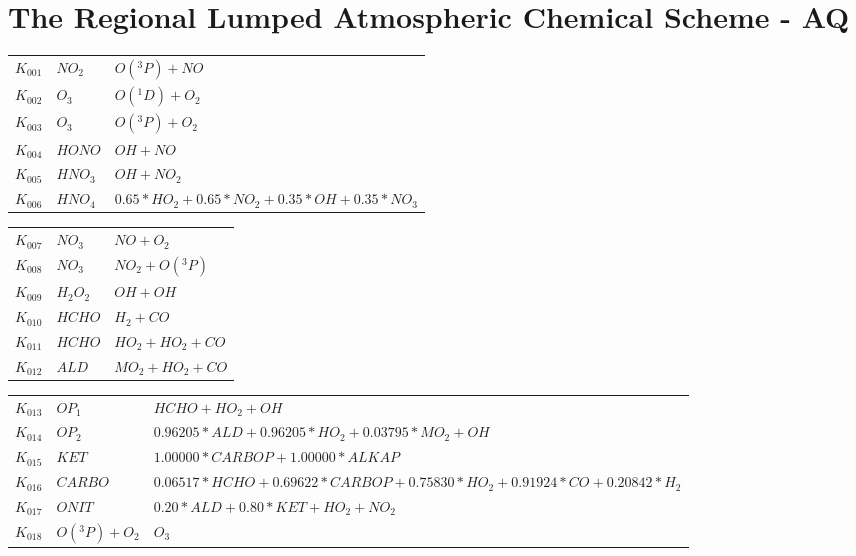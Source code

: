 \section*{The Regional Lumped Atmospheric Chemical Scheme - AQ}
\label{ReLACSAQ}
%
%
{\small
\newlength{\chfwidth}
\setlength{\chfwidth}{1\textwidth}
\noindent
\begin{tabular}{l@{\,:\,}p{0.2\chfwidth}@{$\quad\longrightarrow\quad$}p{0.6\chfwidth}}
$K_{001}$ & $NO_{2}$ & $O({}^3P)+NO$ \\
$K_{002}$ & $O_{3}$ & $O({}^1D)+O_{2}$ \\
$K_{003}$ & $O_{3}$ & $O({}^3P)+O_{2}$ \\
$K_{004}$ & $HONO$ & $OH+NO$ \\
$K_{005}$ & $HNO_{3}$ & $OH+NO_{2}$ \\
$K_{006}$ & $HNO_{4}$ & $0.65*HO_{2}+0.65*NO_{2}+0.35*OH+0.35*NO_{3}$ \\
\end{tabular}
 
\begin{tabular}{l@{\,:\,}p{0.2\chfwidth}@{$\quad\longrightarrow\quad$}p{0.6\chfwidth}}
$K_{007}$ & $NO_{3}$ & $NO+O_{2}$ \\
$K_{008}$ & $NO_{3}$ & $NO_{2}+O({}^3P)$ \\
$K_{009}$ & $H_{2}O_{2}$ & $OH+OH$ \\
$K_{010}$ & $HCHO$ & $H_{2}+CO$ \\
$K_{011}$ & $HCHO$ & $HO_{2}+HO_{2}+CO$ \\
$K_{012}$ & $ALD$ & $MO_{2}+HO_{2}+CO$ \\
\end{tabular}
 
\begin{tabular}{l@{\,:\,}p{0.2\chfwidth}@{$\quad\longrightarrow\quad$}p{0.6\chfwidth}}
$K_{013}$ & $OP_{1}$ & $HCHO+HO_{2}+OH$ \\
$K_{014}$ & $OP_{2}$ & $0.96205*ALD+0.96205*HO_{2}+0.03795*MO_{2}+OH$ \\
$K_{015}$ & $KET$ & $1.00000*CARBOP+1.00000*ALKAP$ \\
$K_{016}$ & $CARBO$ & $0.06517*HCHO+0.69622*CARBOP+0.75830*HO_{2}+0.91924*CO+0.20842*H_{2}$ \\
$K_{017}$ & $ONIT$ & $0.20*ALD+0.80*KET+HO_{2}+NO_{2}$ \\
$K_{018}$ & $O({}^3P)+O_{2}$ & $O_{3}$ \\
\end{tabular}
 
}
